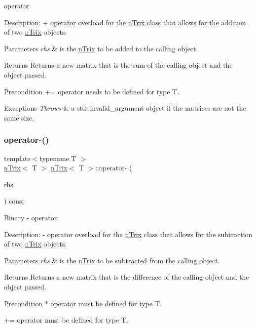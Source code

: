 \begin{DoxyItemize}
\item operator 
\end{DoxyItemize}

Description\+: + operator overload for the \hyperlink{classnTrix}{n\+Trix} class that allows for the addition of two \hyperlink{classnTrix}{n\+Trix} objects. 
\begin{DoxyParams}{Parameters}
{\em rhs} & is the \hyperlink{classnTrix}{n\+Trix} to be added to the calling object. \\
\hline
\end{DoxyParams}
\begin{DoxyReturn}{Returns}
Returns a new matrix that is the sum of the calling object and the object passed. 
\end{DoxyReturn}
\begin{DoxyPrecond}{Precondition}
+= operator needs to be defined for type T. 
\end{DoxyPrecond}

\begin{DoxyExceptions}{Exceptions}
{\em Throws} & a std\+::invalid\+\_\+argument object if the matrices are not the same size. \\
\hline
\end{DoxyExceptions}
\mbox{\label{classnTrix_af43db03d2939e1ccb8f218f3d55543e8}} 
\subsubsection{\texorpdfstring{operator-\/()}{operator-()}\hspace{0.1cm}{\footnotesize\ttfamily [1/2]}}
{\footnotesize\ttfamily template$<$typename T $>$ \\
\hyperlink{classnTrix}{n\+Trix}$<$ T $>$ \hyperlink{classnTrix}{n\+Trix}$<$ T $>$\+::operator-\/ (\begin{DoxyParamCaption}\item[{const \hyperlink{classnTrix}{n\+Trix}$<$ T $>$ \&}]{rhs }\end{DoxyParamCaption}) const}



Binary -\/ operator. 

Description\+: -\/ operator overload for the \hyperlink{classnTrix}{n\+Trix} class that allows for the subtraction of two \hyperlink{classnTrix}{n\+Trix} objects. 
\begin{DoxyParams}{Parameters}
{\em rhs} & is the \hyperlink{classnTrix}{n\+Trix} to be subtracted from the calling object. \\
\hline
\end{DoxyParams}
\begin{DoxyReturn}{Returns}
Returns a new matrix that is the difference of the calling object and the object passed. 
\end{DoxyReturn}
\begin{DoxyPrecond}{Precondition}
$\ast$ operator must be defined for type T. 

+= operator must be defined for type T. 
\end{DoxyPrecond}


